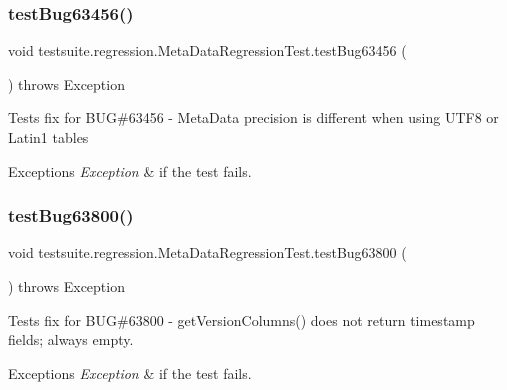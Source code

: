 \subsubsection{\texorpdfstring{test\+Bug63456()}{testBug63456()}}
{\footnotesize\ttfamily void testsuite.\+regression.\+Meta\+Data\+Regression\+Test.\+test\+Bug63456 (\begin{DoxyParamCaption}{ }\end{DoxyParamCaption}) throws Exception}

Tests fix for B\+UG\#63456 -\/ Meta\+Data precision is different when using U\+T\+F8 or Latin1 tables


\begin{DoxyExceptions}{Exceptions}
{\em Exception} & if the test fails. \\
\hline
\end{DoxyExceptions}
\mbox{\label{classtestsuite_1_1regression_1_1_meta_data_regression_test_af38b67a5bf6e3396cd891b3f8b4d2c8f}} 
\subsubsection{\texorpdfstring{test\+Bug63800()}{testBug63800()}}
{\footnotesize\ttfamily void testsuite.\+regression.\+Meta\+Data\+Regression\+Test.\+test\+Bug63800 (\begin{DoxyParamCaption}{ }\end{DoxyParamCaption}) throws Exception}

Tests fix for B\+UG\#63800 -\/ get\+Version\+Columns() does not return timestamp fields; always empty.


\begin{DoxyExceptions}{Exceptions}
{\em Exception} & if the test fails. \\
\hline
\end{DoxyExceptions}
\mbox{\label{classtestsuite_1_1regression_1_1_meta_data_regression_test_ad90f2153ff1faa28e41a28116ad400ca}} 
